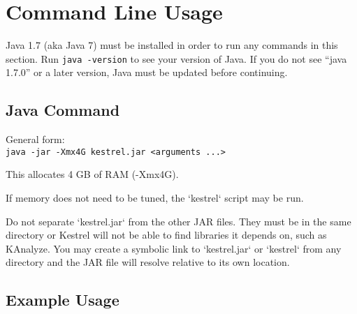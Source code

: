 
\newcommand{\optwidth}{0.15\textwidth}
\newcommand{\argwidth}{0.20\textwidth}
\newcommand{\dscwidth}{0.50\textwidth}
\newcommand{\defwidth}{0.15\textwidth}

\newcommand{\optbox}[1]{\parbox[t][][t]{\optwidth}{#1}\vspace{0.25em}}
\newcommand{\argbox}[1]{\parbox{\argwidth}{#1}}
\newcommand{\dscbox}[1]{\parbox{\dscwidth}{#1}}
\newcommand{\defbox}[1]{\parbox{\defwidth}{#1}}




\section{Command Line Usage}
\label{sec.cmdline}

Java 1.7 (aka Java 7) must be installed in order to run any commands in this section. Run \texttt{java -version} to see your version of Java. If you do not see ``java 1.7.0'' or a later version, Java must be updated before continuing.


\subsection{Java Command}
\label{sec.cmdline.javacommand}

General form:\\
\texttt{java -jar -Xmx4G kestrel.jar <arguments ...>}

This allocates 4 GB of RAM (-Xmx4G).

If memory does not need to be tuned, the `kestrel` script may be run.

Do not separate `kestrel.jar` from the other JAR files. They must be in the same directory or Kestrel will not be able to find libraries it depends on, such as KAnalyze. You may create a symbolic link to `kestrel.jar` or `kestrel` from any directory and the JAR file will resolve relative to its own location.


\subsection{Example Usage}
\label{sec.cmdline.example}


